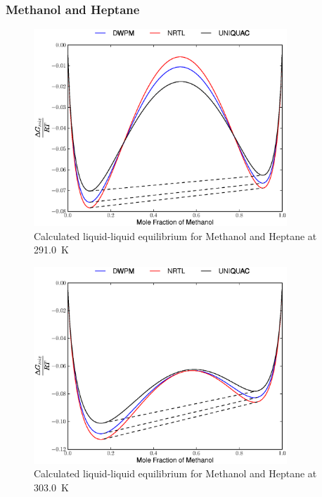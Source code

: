 \subsubsection*{Methanol and Heptane}

\begin{figure}[hp]
\centering
\includegraphics[width = 0.85\textwidth]{Results_Parts/BinaryParams/methanol-heptane/AllModelsGibbsPlots/T_291.eps}
\caption{Calculated liquid-liquid equilibrium for Methanol and Heptane at 291.0~$\mathrm{K}$} \label{methanol-heptane291}
\end{figure}

\begin{figure}[hp]
\centering
\includegraphics[width = 0.85\textwidth]{Results_Parts/BinaryParams/methanol-heptane/AllModelsGibbsPlots/T_303.eps}
\caption{Calculated liquid-liquid equilibrium for Methanol and Heptane at 303.0~$\mathrm{K}$} 
\end{figure}

